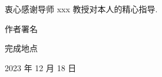 \begin{acknowledgement}
  衷心感谢导师 xxx 教授对本人的精心指导. 

  \vspace{50bp}

  \hfill 作者署名

  \hfill 完成地点

  \hfill 2023 年 12 月 18 日

\end{acknowledgement}
